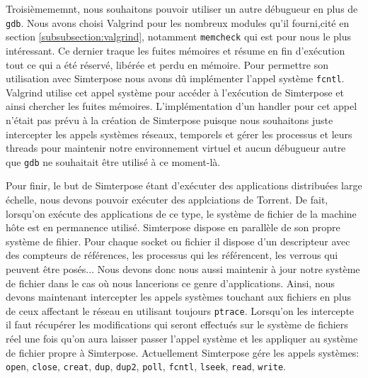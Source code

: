 Troisièmememnt, nous souhaitons pouvoir utiliser un autre débugueur en plus de \texttt{gdb}. Nous avons choisi Valgrind pour les nombreux modules qu'il fourni,cité en section \ref{subsubsection:valgrind}, notamment \texttt{memcheck} qui est pour nous le plus intéressant. Ce dernier traque les fuites mémoires et résume en fin d'exécution tout ce qui a été réservé, libérée et perdu en mémoire. Pour permettre son utilisation avec Simterpose nous avons dû implémenter l'appel système \texttt{fcntl}. Valgrind utilise cet appel système pour accéder à l'exécution de Simterpose et ainsi chercher les fuites mémoires. L'implémentation d'un handler pour cet appel n'était pas prévu à la création de Simterpose puisque nous souhaitons juste intercepter les appels systèmes réseaux, temporels et gérer les processus et leurs threads pour maintenir notre environnement virtuel et aucun débugueur autre que \texttt{gdb} ne souhaitait être utilisé à ce moment-là.

Pour finir, le but de Simterpose étant d'exécuter des applications distribuées large échelle, nous devons pouvoir exécuter des applciations de Torrent. De fait, lorsqu'on exécute des applications de ce type, le système de fichier de la machine hôte est en permanence utilisé. Simterpose dispose en parallèle de son propre système de fihier. Pour chaque socket ou fichier il dispose d'un descripteur avec des compteurs de références, les processus qui les référencent, les verrous qui peuvent être posés... Nous devons donc nous aussi maintenir à jour notre système de fichier dans le cas où nous lancerions ce genre d'applications. Ainsi, nous devons maintenant intercepter les appels systèmes touchant aux fichiers en plus de ceux affectant le réseau en utilisant toujours \texttt{ptrace}. Lorsqu'on les intercepte il faut récupérer les modifications qui seront effectués sur le système de fichiers réel une fois qu'on aura laisser passer l'appel système et les appliquer au système de fichier propre à Simterpose. Actuellement Simterpose gére les appels systèmes: \texttt{open},  \texttt{close}, \texttt{creat}, \texttt{dup}, \texttt{dup2}, \texttt{poll}, \texttt{fcntl}, \texttt{lseek}, \texttt{read}, \texttt{write}.

\vspace{0.5cm}
